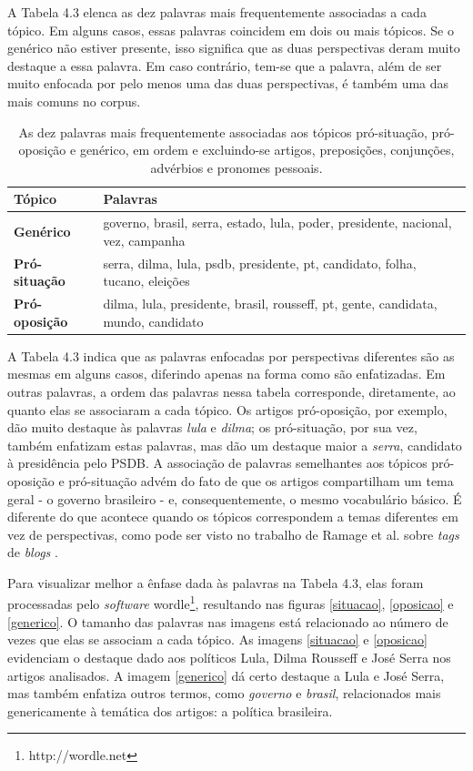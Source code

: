 A Tabela 4.3 elenca as dez palavras mais frequentemente associadas a cada tópico. Em alguns casos, essas palavras coincidem em dois ou mais tópicos. Se o genérico não estiver presente, isso significa que as duas perspectivas deram muito destaque a essa palavra. Em caso contrário, tem-se que a palavra, além de ser muito enfocada por pelo menos uma das duas perspectivas, é também uma das mais comuns no corpus.

\begin{table}[h]
\centering
\begin{tabular}{| l | p{10cm} | }
\hline
\textbf{Tópico} & \textbf{Palavras} \\ \hline
\textbf{Genérico} &  governo, brasil, serra, estado, lula, poder, presidente, nacional, vez, campanha \\ \hline
\textbf{Pró-situação} & serra, dilma, lula, psdb, presidente, pt, candidato, folha, tucano, eleições\\ \hline
\textbf{Pró-oposição} & dilma, lula, presidente, brasil, rousseff, pt, gente, candidata, mundo, candidato \\ \hline
\end{tabular}
\label{tab:palavras}
\caption{As dez palavras mais frequentemente associadas aos tópicos pró-situação, pró-oposição e genérico, em ordem e excluindo-se artigos, preposições, conjunções, advérbios e pronomes pessoais.}
\end{table}

A Tabela 4.3 indica que as palavras enfocadas por perspectivas diferentes são as mesmas em alguns casos, diferindo apenas na forma como são enfatizadas. Em outras palavras, a ordem das palavras nessa tabela corresponde, diretamente, ao quanto elas se associaram a cada tópico. Os artigos pró-oposição, por exemplo, dão muito destaque às palavras \emph{lula} e \emph{dilma}; os pró-situação, por sua vez, também enfatizam estas palavras, mas dão um destaque maior a \emph{serra}, candidato à presidência pelo PSDB. A associação de palavras semelhantes aos tópicos pró-oposição e pró-situação advém do fato de que os artigos compartilham um tema geral - o governo brasileiro - e, consequentemente, o mesmo vocabulário básico. É diferente do que acontece quando os tópicos correspondem a temas diferentes em vez de perspectivas, como pode ser visto no trabalho de Ramage et al. sobre \emph{tags} de \emph{blogs} \cite{llda}.

Para visualizar melhor a ênfase dada às palavras na Tabela 4.3, elas foram processadas pelo \emph{software} wordle\footnote{http://wordle.net}, resultando nas figuras \ref{situacao}, \ref{oposicao} e \ref{generico}. O tamanho das palavras nas imagens está relacionado ao número de vezes que elas se associam a cada tópico. As imagens \ref{situacao} e \ref{oposicao} evidenciam o destaque dado aos políticos Lula, Dilma Rousseff e José Serra nos artigos analisados. A imagem \ref{generico} dá certo destaque a Lula e José Serra, mas também enfatiza outros termos, como \emph{governo} e \emph{brasil}, relacionados mais genericamente à temática dos artigos: a política brasileira.

